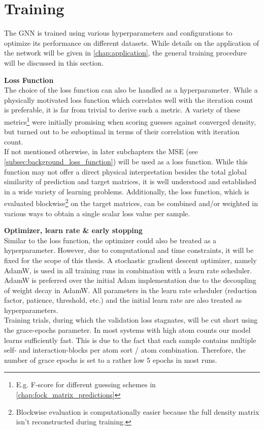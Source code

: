 \section{Training}
\label{sec:gnn_training}
The GNN is trained using various hyperparameters and configurations to optimize its performance on different datasets. While details on the application of the network will be given in \autoref{chap:application}, the general training procedure will be discussed in this section.

\textbf{Loss Function}\\
The choice of the loss function can also be handled as a hyperparameter. While a physically motivated loss function which correlates well with the iteration count is preferable, it is far from trivial to derive such a metric. A variety of these metrics\footnote{E.g. F-score for different guessing schemes in \autoref{chap:fock_matrix_predictions}} were initially promising when scoring guesses against converged density, but turned out to be suboptimal in terms of their correlation with iteration count. \\
If not mentioned otherwise, in later subchapters the MSE (see \autoref{subsec:background_loss_function}) will be used as a loss function. While this function may not offer a direct physical interpretation besides the total global similarity of prediction and target matrices, it is well understood and established in a wide variety of learning problems. Additionally, the loss function, which is evaluated blockwise\footnote{Blockwise evaluation is computationally easier because the full density matrix isn't reconstructed during training.} on the target matrices, can be combined and/or weighted in various ways to obtain a single scalar loss value per sample. 

\textbf{Optimizer, learn rate \& early stopping}\\
Similar to the loss function, the optimizer could also be treated as a hyperparameter. However, due to computational and time constraints, it will be fixed for the scope of this thesis. A stochastic gradient descent optimizer, namely AdamW, is used in all training runs in combination with a learn rate scheduler. AdamW is preferred over the initial Adam implementation due to the decoupling of weight decay in AdamW. \parencite{ref:adamW} All parameters in the learn rate scheduler (reduction factor, patience, threshold, etc.) and the initial learn rate are also treated as hyperparameters. \\
Training trials, during which the validation loss stagnates, will be cut short using the grace-epochs parameter. In most systems with high atom counts our model learns sufficiently fast. This is due to the fact that each sample contains multiple self- and interaction-blocks per atom sort / atom combination. Therefore, the number of grace epochs is set to a rather low 5 epochs in most runs. 

